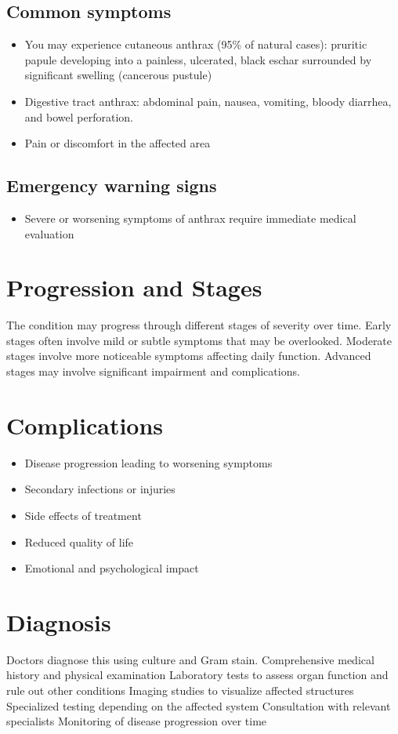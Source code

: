 \subsection{Common symptoms}
\begin{itemize}[noitemsep]
  \item You may experience cutaneous anthrax (95\% of natural cases): pruritic papule developing into a painless, ulcerated, black eschar surrounded by significant swelling (cancerous pustule)
  \item Digestive tract anthrax: abdominal pain, nausea, vomiting, bloody diarrhea, and bowel perforation.
  \item Pain or discomfort in the affected area
  \end{itemize}

\subsection{Emergency warning signs}
\begin{itemize}[noitemsep]
  \item Severe or worsening symptoms of anthrax require immediate medical evaluation
\end{itemize}
\section{Progression and Stages}
The condition may progress through different stages of severity over time. Early stages often involve mild or subtle symptoms that may be overlooked. Moderate stages involve more noticeable symptoms affecting daily function. Advanced stages may involve significant impairment and complications.
\section{Complications}
\begin{itemize}[noitemsep]
  \item Disease progression leading to worsening symptoms
  \item Secondary infections or injuries
  \item Side effects of treatment
  \item Reduced quality of life
  \item Emotional and psychological impact
\end{itemize}
\section{Diagnosis}
Doctors diagnose this using culture and Gram stain. Comprehensive medical history and physical examination Laboratory tests to assess organ function and rule out other conditions Imaging studies to visualize affected structures Specialized testing depending on the affected system Consultation with relevant specialists Monitoring of disease progression over time


